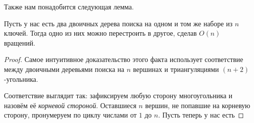 Также нам понадобится следующая лемма.

\begin{lemma}\label{tree_distance} Пусть у нас есть два двоичных дерева поиска на одном и том же наборе из $n$ ключей. Тогда одно из них можно перестроить в другое, сделав $O(n)$ вращений.
\end{lemma}
\begin{proof} Самое интуитивное доказательство этого факта использует соответствие
между двоичными деревьями поиска на $n$ вершинах и триангуляциями $(n + 2)$-угольника.

Соответствие выглядит так: зафиксируем любую сторону многоугольника и назовём её \emph{корневой стороной}. Оставшиеся $n$ вершин, не попавшие на корневую сторону,
пронумеруем по циклу числами от $1$ до $n$. Пусть теперь у нас есть 

\end{proof}


